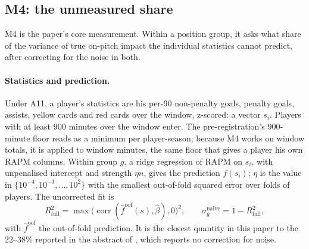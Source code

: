 \documentclass[11pt,a4paper]{article}
\DeclareMathOperator{\corr}{corr}
\begin{document}
\subsection{M4: the unmeasured share}
\label{sec:m4}

M4 is the paper's core measurement. Within a position group, it asks what
share of the variance of true on-pitch impact the individual statistics cannot
predict, after correcting for the noise in both.

\paragraph{Statistics and prediction.}
Under A11, a player's statistics are his per-90 non-penalty goals, penalty
goals, assists, yellow cards and red cards over the window, z-scored: a vector
$s_i$. Players with at least 900 minutes over the window enter. The
pre-registration's 900-minute floor reads as a minimum per player-season;
because M4 works on window totals, it is applied to window minutes, the same
floor that gives a player his own RAPM columns. Within group
$g$, a ridge
regression of RAPM on $s_i$, with unpenalised intercept and strength $\eta n$,
gives the prediction $f(s_i)$; $\eta$ is the value in
$\{10^{-4}, 10^{-3}, \dots, 10^{2}\}$ with the smallest out-of-fold squared
error over folds of players. The uncorrected fit is
\begin{equation}
  R^2_{\text{full}} = \max\big(\corr(\hat f^{\text{oof}}(s), \hat\beta), 0\big)^2,
  \qquad \sigma^{\text{naive}}_g = 1 - R^2_{\text{full}},
  \label{eq:r2full}
\end{equation}
with $\hat f^{\text{oof}}$ the out-of-fold prediction. It is the closest
quantity in this paper to the 22--38\% reported in the abstract of
\citet{gelade2020events}, which reports no correction for noise.
\end{document}

